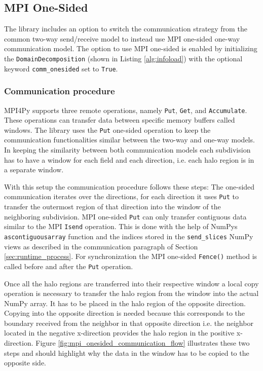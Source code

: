 \newpage
\subsection{MPI One-Sided}
\label{sec:onesided}
The library includes an option to switch the communication strategy from the common two-way send/receive model to instead use MPI one-sided one-way communication model.
The option to use MPI one-sided is enabled by initializing the \texttt{DomainDecomposition} (shown in Listing \ref{alg:infoload}) with the optional keyword \texttt{comm\_onesided} set to \texttt{True}.

\subsubsection{Communication procedure}
MPI4Py supports three remote operations, namely \texttt{Put}, \texttt{Get}, and \texttt{Accumulate}.
These operations can transfer data between specific memory buffers called windows.
The library uses the \texttt{Put} one-sided operation to keep the communication functionalities similar between the two-way and one-way models.
In keeping the similarity between both communication models each subdivision has to have a window for each field and each direction, i.e. each halo region is in a separate window.

With this setup the communication procedure follows these steps: 
The one-sided communication iterates over the directions, for each direction it uses \texttt{Put} to transfer the outermost region of that direction into the window of the neighboring subdivision.
MPI one-sided \texttt{Put} can only transfer contiguous data similar to the MPI \texttt{Isend} operation.
This is done with the help of NumPys \texttt{ascontiguousarray} function and the indices stored in the \texttt{send\_slices} NumPy views as described in the communication paragraph of Section \ref{sec:runtime_process}.
For synchronization the MPI one-sided \texttt{Fence()} method is called before and after the \texttt{Put} operation.

Once all the halo regions are transferred into their respective window a local copy operation is necessary to transfer the halo region from the window into the actual NumPy array.
It has to be placed in the halo region of the opposite direction.
Copying into the opposite direction is needed because this corresponds to the boundary received from the neighbor in that opposite direction i.e. the neighbor located in the negative x-direction provides the halo region in the positive x-direction.
Figure \ref{fig:mpi_onesided_communication_flow} illustrates these two steps and should highlight why the data in the window has to be copied to the opposite side.

